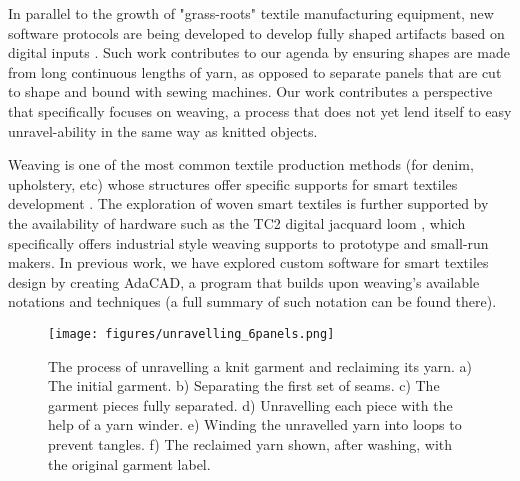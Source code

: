 \documentclass{sigchi}
\begin{document}
In parallel to the growth of "grass-roots" textile manufacturing equipment, new software protocols are being developed to develop fully shaped artifacts based on digital inputs \cite{mccann_compiler_2016, albaugh_digital_2019}. Such work contributes to our agenda by ensuring shapes are made from long continuous lengths of yarn, as opposed to separate panels that are cut to shape and bound with sewing machines. Our work contributes a perspective that specifically focuses on weaving, a process that does not yet lend itself to easy unravel-ability in the same way as knitted objects. 

Weaving is one of the most common textile production methods (for denim, upholstery, etc) whose structures offer specific supports for smart textiles development \cite{devendorf_adapting_2019, poupyrev_project_2016, worbin_designing_2010, orth_fabric_1998, mikkonen_weaving_2015}. The exploration of woven smart textiles is further supported by the availability of hardware such as the TC2 digital jacquard loom \cite{norway_tc2_nodate}, which specifically offers industrial style weaving supports to prototype and small-run makers. In previous work, we have explored custom software for smart textiles design by creating AdaCAD, a program that builds upon weaving's available notations and techniques \cite{friske_adacad:_2019} (a full summary of such notation can be found there).

\begin{figure*}[ht!]
    \centering
    \texttt{[image: figures/unravelling\_6panels.png]}
    \caption{The process of unravelling a knit garment and reclaiming its yarn. a) The initial garment. b) Separating the first set of seams. c) The garment pieces fully separated. d) Unravelling each piece with the help of a yarn winder. e) Winding the unravelled yarn into loops to prevent tangles. f) The reclaimed yarn shown, after washing, with the original garment label.}
    \label{fig:unravelProcess}
    \vspace{-1em}
\end{figure*}
\end{document}
